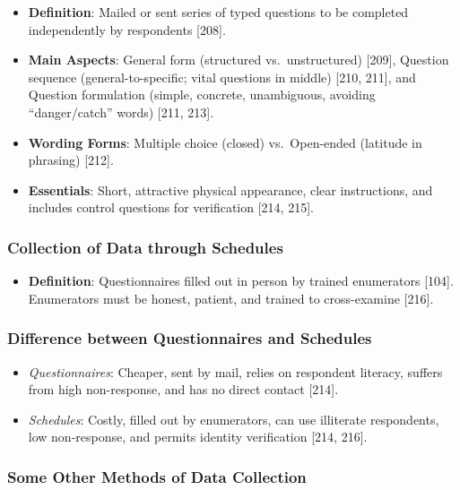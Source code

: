 \documentclass[
]{article}
\providecommand{\tightlist}{%
  \setlength{\itemsep}{0pt}\setlength{\parskip}{0pt}}
\begin{document}
\begin{itemize}
\tightlist
\item
  \textbf{Definition}: Mailed or sent series of typed questions to be
  completed independently by respondents {[}208{]}.
\item
  \textbf{Main Aspects}: General form (structured vs.~unstructured)
  {[}209{]}, Question sequence (general-to-specific; vital questions in
  middle) {[}210, 211{]}, and Question formulation (simple, concrete,
  unambiguous, avoiding ``danger/catch'' words) {[}211, 213{]}.
\item
  \textbf{Wording Forms}: Multiple choice (closed) vs.~Open-ended
  (latitude in phrasing) {[}212{]}.
\item
  \textbf{Essentials}: Short, attractive physical appearance, clear
  instructions, and includes control questions for verification {[}214,
  215{]}.
\end{itemize}

\subsubsection{Collection of Data through
Schedules}\label{collection-of-data-through-schedules}

\begin{itemize}
\tightlist
\item
  \textbf{Definition}: Questionnaires filled out in person by trained
  enumerators {[}104{]}. Enumerators must be honest, patient, and
  trained to cross-examine {[}216{]}.
\end{itemize}

\subsubsection{Difference between Questionnaires and
Schedules}\label{difference-between-questionnaires-and-schedules}

\begin{itemize}
\tightlist
\item
  \emph{Questionnaires}: Cheaper, sent by mail, relies on respondent
  literacy, suffers from high non-response, and has no direct contact
  {[}214{]}.
\item
  \emph{Schedules}: Costly, filled out by enumerators, can use
  illiterate respondents, low non-response, and permits identity
  verification {[}214, 216{]}.
\end{itemize}

\subsubsection{Some Other Methods of Data
Collection}\label{some-other-methods-of-data-collection}
\end{document}
